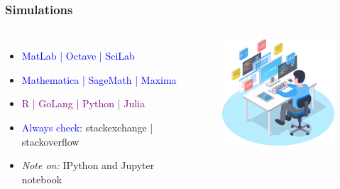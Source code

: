 \documentclass[newPxFont,sthlmFooter]{beamer}
\newcommand{\fs}{\footnotesize}
\begin{document}
\begin{frame}\frametitle{Simulations}
  \begin{columns}[T,onlytextwidth]
      \vspace{1cm}
  \begin{itemize}
    \fs
	\item \textcolor{blue}{MatLab | Octave | SciLab}
	\item \textcolor{blue}{Mathematica | SageMath | Maxima}
	\item \textcolor{purple}{R | GoLang | Python | Julia}
	\item \textcolor{blue}{Always check:} stackexchange | stackoverflow
	\item {\it Note on:} IPython and Jupyter notebook
  \end{itemize}
        \vspace{0.5cm}
              \vspace{-0.5cm}
  \begin{figure}
    \centering
    \includegraphics[width=2in]{figs/pgm} 
  \end{figure}
  \end{columns}
\end{frame}
\end{document}
